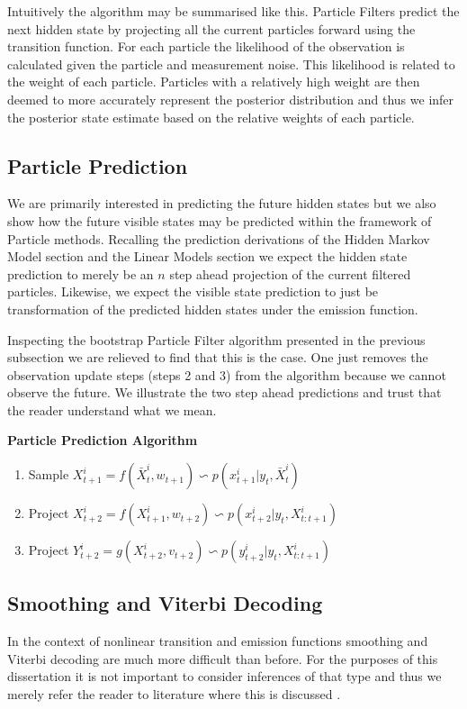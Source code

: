 Intuitively the algorithm may be summarised like this. Particle Filters predict the next hidden state by projecting all the current particles forward using the transition function. For each particle the likelihood of the observation is calculated given the particle and measurement noise. This likelihood is related to the weight of each particle. Particles with a relatively high weight are then deemed to more accurately represent the posterior distribution and thus we infer the posterior state estimate based on the relative weights of each particle.

\subsection{Particle Prediction}
\label{sec_particle_prediction}
We are primarily interested in predicting the future hidden states but we also show how the future visible states may be predicted within the framework of Particle methods. Recalling the prediction derivations of the Hidden Markov Model section and the Linear Models section we expect the hidden state prediction to merely be an $n$ step ahead projection of the current filtered particles. Likewise, we expect the visible state prediction to just be transformation of the predicted hidden states under the emission function. 

Inspecting the bootstrap Particle Filter algorithm presented in the previous subsection we are relieved to find that this is the case. One just removes the observation update steps (steps 2 and 3) from the algorithm because we cannot observe the future. We illustrate the two step ahead predictions and trust that the reader understand what we mean.

\textbf{Particle Prediction Algorithm}
\begin{enumerate}
\item
Sample $X_{t+1}^i = f(\bar{X}_t^i, w_{t+1}) \backsim p(x_{t+1}^i|y_t, \bar{X}_t^i)$ 
\item
Project $X_{t+2}^i = f(X_{t+1}^i, w_{t+2}) \backsim p(x_{t+2}^i|y_t, X_{t:t+1}^i)$ 
\item
Project $Y_{t+2}^i = g(X_{t+2}^i, v_{t+2}) \backsim p(y_{t+2}^i|y_t, X_{t:t+1}^i)$ 
\end{enumerate}

\subsection{Smoothing and Viterbi Decoding}
In the context of nonlinear transition and emission functions smoothing and Viterbi decoding are much more difficult than before. For the purposes of this dissertation it is not important to consider inferences of that type and thus we merely refer the reader to literature where this is discussed \cite{pftut}\cite{gsf1}\cite{murphy1}\cite{murphy2}\cite{barber}.

